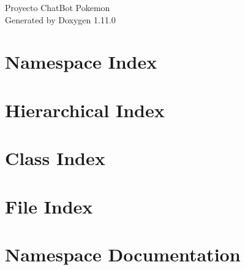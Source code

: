 \documentclass[twoside]{book}
\newcommand{\+}{\discretionary{\mbox{\scriptsize$\hookleftarrow$}}{}{}}
\newcommand{\clearemptydoublepage}{%
    \newpage{\pagestyle{empty}\cleardoublepage}%
  }
\begin{document}
  \raggedbottom
    \hypersetup{pageanchor=false,
                bookmarksnumbered=true,
                pdfencoding=unicode
               }
  \begin{titlepage}
  \vspace*{7cm}
  \begin{center}%
  {\Large Proyecto Chat\+Bot Pokemon}\\
  \vspace*{1cm}
  {\large Generated by Doxygen 1.11.0}\\
  \end{center}
  \end{titlepage}
  \clearemptydoublepage
  \tableofcontents
  \clearemptydoublepage
  \hypersetup{pageanchor=true}
\chapter{Namespace Index}

\chapter{Hierarchical Index}

\chapter{Class Index}

\chapter{File Index}

\chapter{Namespace Documentation}







\end{document}

